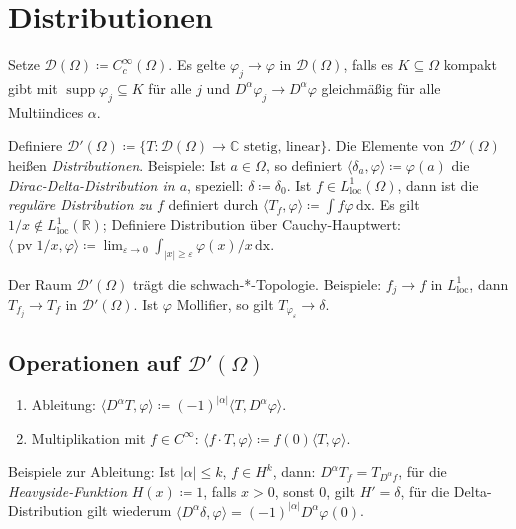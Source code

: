 \documentclass[11pt,a4paper]{scrartcl}
\newcommand{\R}{\mathbb{R}} %
\newcommand{\C}{\mathbb{C}} %
\newcommand{\D}{\mathcal{D}}
\theoremstyle{plain}
\theoremstyle{definition}
\theoremstyle{remark}
\DeclareMathOperator{\supp}{supp}
\DeclareMathOperator{\loc}{loc}
\DeclareMathOperator{\pv}{pv}
\begin{document}
\section{Distributionen}

Setze $\D(\Omega)\coloneqq C_c^\infty(\Omega)$. Es gelte $\varphi_j \to \varphi$ in $\D(\Omega)$, falls es $K\subseteq \Omega$ kompakt gibt mit $\supp \varphi_j \subseteq K$ für alle $j$ und $D^\alpha \varphi_j \to D^\alpha \varphi$ gleichmäßig für alle Multiindices $\alpha$.

Definiere $\D'(\Omega)\coloneqq \{ T: \D(\Omega) \to \C \text{ stetig, linear} \}$. Die Elemente von $\D'(\Omega)$ heißen \emph{Distributionen}. Beispiele: Ist $a\in \Omega$, so definiert $\langle \delta_a, \varphi \rangle \coloneqq \varphi(a)$ die \emph{Dirac-Delta-Distribution in $a$}, speziell: $\delta \coloneqq \delta_0$. Ist $f\in L^1_{\loc}(\Omega)$, dann ist die \emph{reguläre Distribution zu $f$} definiert durch $\langle T_f, \varphi \rangle \coloneqq \int f\varphi \, \mathrm{dx}$. Es gilt $1/x\not\in L^1_{\loc}(\R)$; Definiere Distribution über Cauchy-Hauptwert: $\langle \pv 1/x, \varphi \rangle \coloneqq \lim_{\varepsilon \to 0} \int_{|x|\geq \varepsilon} \varphi(x)/x \, \mathrm{dx}$.

Der Raum $\D'(\Omega)$ trägt die schwach-*-Topologie. Beispiele: $f_j\to f$ in $L^1_{\loc}$, dann $T_{f_j}\to T_f$ in $\D'(\Omega)$. Ist $\varphi$ Mollifier, so gilt $T_{\varphi_\varepsilon}\to \delta$.

\subsection{Operationen auf $\D'(\Omega)$}

\begin{enumerate}
    \item Ableitung: $\langle D^\alpha T, \varphi \rangle \coloneqq (-1)^{|\alpha|} \langle T, D^\alpha \varphi \rangle$.
    \item Multiplikation mit $f\in C^\infty$: $\langle f\cdot T, \varphi \rangle \coloneqq f(0) \langle T, \varphi \rangle$.
\end{enumerate}

Beispiele zur Ableitung: Ist $|\alpha| \leq k$, $f\in H^k$, dann: $D^\alpha T_f = T_{D^\alpha f}$, für die \emph{Heavyside-Funktion} $H(x)\coloneqq 1$, falls $x>0$, sonst $0$, gilt $H'=\delta$, für die Delta-Distribution gilt wiederum $\langle D^\alpha \delta, \varphi \rangle = (-1)^{|\alpha|} D^\alpha \varphi(0)$.
\end{document}
